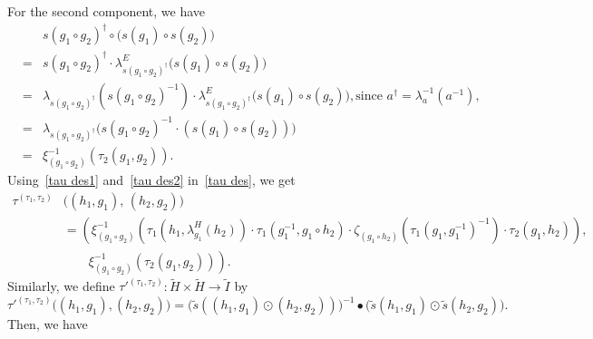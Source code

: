 \documentclass{jonasart}
\theoremstyle{plain}
\begin{document}
	For the second component, we have
	\begin{eqnarray}
		&& s(g_1\circ g_2 )^\dagger\circ \big(s(g_1 )\circ s(g_2 ) \big)\nonumber\\
		&=&s(g_1\circ g_2 )^\dagger \cdot \lambda^E_{s(g_1\circ g_2 )^\dagger} \big(s(g_1 )\circ s(g_2 ) \big)\nonumber\\
		&=&\lambda_{s(g_1\circ g_2 )^\dagger}(s(g_1\circ g_2 )^{-1}) \cdot \lambda^E_{s(g_1\circ g_2 )^\dagger} \big(s(g_1 )\circ s(g_2 )\big), \text{since $a^\dagger=\lambda^{-1}_a (a^{-1})$,}\nonumber\\
		&=&\lambda_{s(g_1\circ g_2 )^\dagger}\big(s(g_1\circ g_2 )^{-1} \cdot (s(g_1 )\circ s(g_2 ))\big)\nonumber\\
		&=&\xi^{-1}_{(g_1\circ g_2 )}(\tau_2 (g_1,g_2 )).\label{tau des2}
	\end{eqnarray}
	Using~\eqref{tau des1} and~\eqref{tau des2} in~\eqref{tau des}, we get
	\begin{align}
		\tau^{(\tau_1,\tau_2 )}&\big((h_1,g_1 ), \, (h_2,g_2 )\big) \nonumber\\
		&= \left( \xi^{-1}_{(g_1\circ g_2 )}(\tau_1 (h_1,\lambda^H_{g_1}(h_2 )) \cdot \tau_1 (g_1^{-1},g_1\circ h_2 ) \cdot\zeta_{(g_1\circ h_2 )}(\tau_1 (g_1,g_1^{-1})^{-1}) \cdot \tau_2 (g_1, h_2 )), \right. \nonumber \\
		&\qquad \left. \xi^{-1}_{(g_1\circ g_2 )}(\tau_2 (g_1,g_2 )) \right).
		\label{tau 2 prime}
	\end{align}
	Similarly, we define $\tau'^{(\tau_1,\tau_2 )}\colon \widetilde{H} \times \widetilde{H}\to \widetilde{I}$ by
	\[
	\tau'^{(\tau_1,\tau_2)} \big((h_1,g_1),(h_2,g_2)\big)=\big(\widetilde{s}((h_1,g_1)\odot(h_2,g_2))\big)^{-1} \bullet \big(\widetilde{s}(h_1,g_1)\odot \widetilde{s}(h_2,g_2)\big).
	\]
	Then, we have
\end{document}
